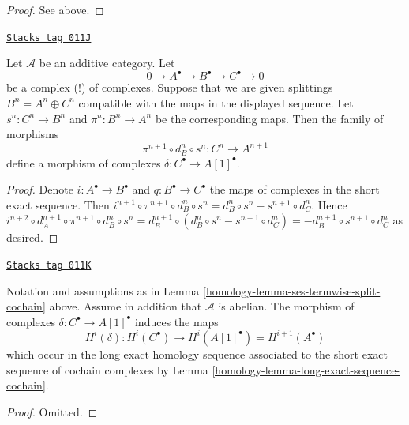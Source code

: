 \begin{proof}
See above.
\end{proof}

\begin{lemma}
\label{homology-lemma-ses-termwise-split-cochain}
\href{https://stacks.math.columbia.edu/tag/011J}{\texttt{Stacks tag 011J}}

Let $\mathcal{A}$ be an additive category.
Let
$$
0 \to A^\bullet \to B^\bullet \to C^\bullet \to 0
$$
be a complex (!) of complexes.
Suppose that we are given splittings $B^n = A^n \oplus C^n$
compatible with the maps in the displayed sequence.
Let $s^n : C^n \to B^n$ and $\pi^n : B^n \to A^n$ be the
corresponding maps. Then the family of morphisms
$$
\pi^{n + 1} \circ d_B^n \circ s^n
:
C^n \to A^{n + 1}
$$
define a morphism of complexes $\delta : C^\bullet \to A[1]^\bullet$.
\end{lemma}

\begin{proof}
Denote $i : A^\bullet \to B^\bullet$ and $q : B^\bullet \to C^\bullet$
the maps of complexes in the short exact sequence. Then
$i^{n + 1} \circ \pi^{n + 1} \circ d_B^n \circ s^n =
d_B^n \circ s^n - s^{n + 1} \circ d_C^n$. Hence
$i^{n + 2} \circ d_A^{n + 1} \circ \pi^{n + 1} \circ d_B^n \circ s^n =
d_B^{n + 1} \circ (d_B^n \circ s^n - s^{n + 1} \circ d_C^n) =
- d_B^{n + 1} \circ s^{n + 1} \circ d_C^n$ as desired.
\end{proof}

\begin{lemma}
\label{homology-lemma-ses-termwise-split-long-cochain}
\href{https://stacks.math.columbia.edu/tag/011K}{\texttt{Stacks tag 011K}}

Notation and assumptions as in
Lemma \ref{homology-lemma-ses-termwise-split-cochain} above.
Assume in addition that $\mathcal{A}$ is abelian.
The morphism of complexes $\delta : C^\bullet \to A[1]^\bullet$
induces the maps
$$
H^i(\delta) :
H^i(C^\bullet) \longrightarrow H^i(A[1]^\bullet) = H^{i + 1}(A^\bullet)
$$
which occur in the long exact homology sequence associated
to the short exact sequence of cochain complexes by
Lemma \ref{homology-lemma-long-exact-sequence-cochain}.
\end{lemma}

\begin{proof}
Omitted.
\end{proof}

